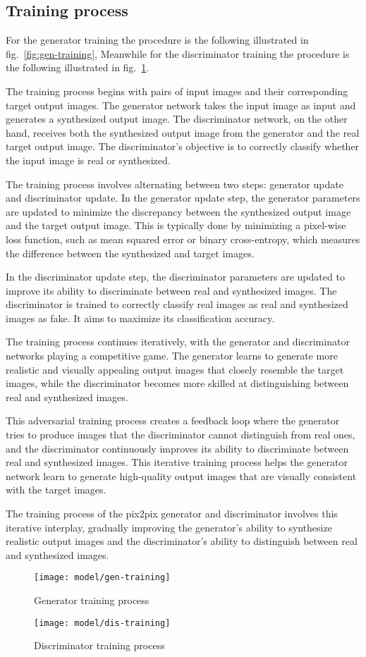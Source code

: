 \subsection{Training process}\label{subsec:training-process}
For the generator training the procedure is the following illustrated in fig.~\ref{fig:gen-training}, Meanwhile for the discriminator training the procedure is the following illustrated in fig.~\ref{fig:dis-training}.
\par
The training process begins with pairs of input images and their corresponding target output images. 
The generator network takes the input image as input and generates a synthesized output image. 
The discriminator network, on the other hand, receives both the synthesized output image from the generator and the real target output image. 
The discriminator's objective is to correctly classify whether the input image is real or synthesized.
\par
The training process involves alternating between two steps: generator update and discriminator update. 
In the generator update step, the generator parameters are updated to minimize the discrepancy between the synthesized output image and the target output image. 
This is typically done by minimizing a pixel-wise loss function, such as mean squared error or binary cross-entropy, which measures the difference between the synthesized and target images.
\par 
In the discriminator update step, the discriminator parameters are updated to improve its ability to discriminate between real and synthesized images. 
The discriminator is trained to correctly classify real images as real and synthesized images as fake. It aims to maximize its classification accuracy.
\par
The training process continues iteratively, with the generator and discriminator networks playing a competitive game. 
The generator learns to generate more realistic and visually appealing output images that closely resemble the target images, while the discriminator becomes more skilled at distinguishing between real and synthesized images.
\par
This adversarial training process creates a feedback loop where the generator tries to produce images that the discriminator cannot distinguish from real ones, and the discriminator continuously improves its ability to discriminate between real and synthesized images. 
This iterative training process helps the generator network learn to generate high-quality output images that are visually consistent with the target images.
\par
The training process of the pix2pix generator and discriminator involves this iterative interplay, gradually improving the generator's ability to synthesize realistic output images and the discriminator's ability to distinguish between real and synthesized images.
\begin{figure}
    \centering
    \texttt{[image: model/gen-training]}
    \caption{Generator training process}\label{fig:gen-training}
    \texttt{[image: model/dis-training]}
    \caption{Discriminator training process}\label{fig:dis-training}
\end{figure}
